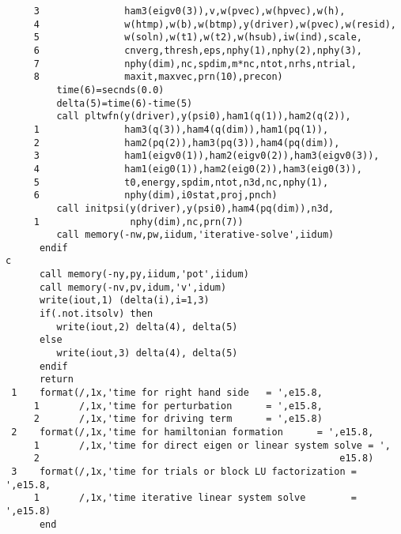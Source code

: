 \documentclass{article}
\begin{document}
\begin{verbatim}
     3               ham3(eigv0(3)),v,w(pvec),w(hpvec),w(h),
     4               w(htmp),w(b),w(btmp),y(driver),w(pvec),w(resid),
     5               w(soln),w(t1),w(t2),w(hsub),iw(ind),scale,
     6               cnverg,thresh,eps,nphy(1),nphy(2),nphy(3),
     7               nphy(dim),nc,spdim,m*nc,ntot,nrhs,ntrial,
     8               maxit,maxvec,prn(10),precon)
         time(6)=secnds(0.0)
         delta(5)=time(6)-time(5)
         call pltwfn(y(driver),y(psi0),ham1(q(1)),ham2(q(2)),
     1               ham3(q(3)),ham4(q(dim)),ham1(pq(1)),
     2               ham2(pq(2)),ham3(pq(3)),ham4(pq(dim)),
     3               ham1(eigv0(1)),ham2(eigv0(2)),ham3(eigv0(3)),
     4               ham1(eig0(1)),ham2(eig0(2)),ham3(eig0(3)),
     5               t0,energy,spdim,ntot,n3d,nc,nphy(1),
     6               nphy(dim),i0stat,proj,pnch)
         call initpsi(y(driver),y(psi0),ham4(pq(dim)),n3d,
     1                nphy(dim),nc,prn(7))
         call memory(-nw,pw,iidum,'iterative-solve',iidum)
      endif
c
      call memory(-ny,py,iidum,'pot',iidum)
      call memory(-nv,pv,idum,'v',idum)
      write(iout,1) (delta(i),i=1,3)
      if(.not.itsolv) then
         write(iout,2) delta(4), delta(5)
      else
         write(iout,3) delta(4), delta(5)
      endif
      return
 1    format(/,1x,'time for right hand side   = ',e15.8,
     1       /,1x,'time for perturbation      = ',e15.8,
     2       /,1x,'time for driving term      = ',e15.8)
 2    format(/,1x,'time for hamiltonian formation      = ',e15.8,
     1       /,1x,'time for direct eigen or linear system solve = ',
     2                                                     e15.8)
 3    format(/,1x,'time for trials or block LU factorization = ',e15.8,
     1       /,1x,'time iterative linear system solve        = ',e15.8)
      end
\end{verbatim}
\end{document}
